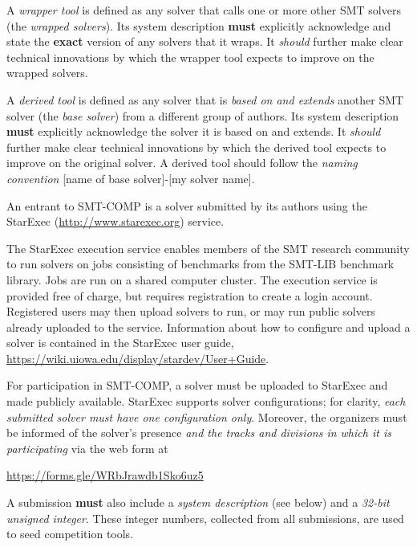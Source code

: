 \documentclass[12pt]{article}
\begin{document}
%
A \emph{wrapper tool} is defined as any solver that calls one or more other SMT
solvers (the \emph{wrapped solvers}). Its system description \textbf{must}
explicitly acknowledge and state the \textbf{exact} version of any solvers that
it wraps.  It \emph{should} further make clear technical innovations by which
the wrapper tool expects to improve on the wrapped solvers.

%
A \emph{derived tool} is defined as any solver that is \emph{based on and
extends} another SMT solver (the \emph{base solver}) from a different
group of authors.  Its system description
\textbf{must} explicitly acknowledge
the solver it is based on and extends.  It \emph{should} further make clear
technical innovations by which the derived tool expects to improve on the
original solver.  A derived tool should follow the \emph{naming convention}
{[name of base solver]-[my solver name]}.

%
An entrant to SMT-COMP is a solver submitted by its authors using
the StarExec (\url{http://www.starexec.org}) service.

%
The StarExec execution
service enables members of the SMT research community to run solvers
on jobs consisting of benchmarks from the SMT-LIB benchmark library.
Jobs are run on a shared computer cluster.  The execution service is
provided free of charge, but requires registration to create a
login account.  Registered users may then upload solvers to
run, or may run public solvers already uploaded to the service.
Information about how to configure and upload a solver is contained in
the StarExec user guide,
\url{https://wiki.uiowa.edu/display/stardev/User+Guide}.

%
For participation in SMT-COMP, a solver must be uploaded to StarExec
and made publicly available.  StarExec supports solver configurations;
for clarity, \emph{each submitted solver must have one configuration
  only}.  Moreover, the organizers must be informed of the solver's
presence \emph{and the tracks and divisions in which it is
  participating} via the web form at
\begin{center}
  \url{https://forms.gle/WRbJrawdb1Sko6uz5}
\end{center}
A submission \textbf{must} also include a \emph{system description} (see below)
and a \emph{32-bit unsigned integer}.
 These integer numbers, collected from all submissions, are used to seed
 competition tools.
\end{document}
